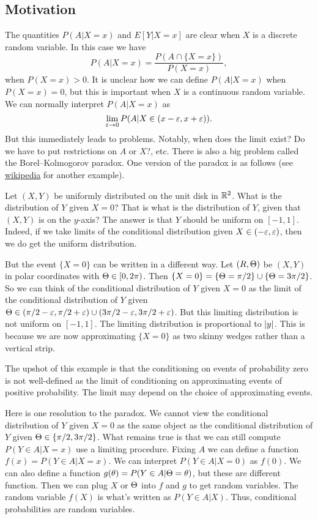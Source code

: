 \subsection{Motivation}
The quantities $P(A|X=x)$ and $E[Y|X=x]$ are clear when $X$ is a discrete random variable. In this case we have 
\[P(A |X=x) = \frac{P(A \cap \{X=x\})}{P(X=x)}, \]
when $P(X=x) > 0$. It is unclear how we can define $P(A|X=x)$ when $P(X=x)=0$, but this is important when $X$ is a continuous random variable. We can normally interpret $P(A|X=x)$ as
\[\lim_{\varepsilon \to 0} P(A |X\in (x-\varepsilon,x+\varepsilon)). \]
But this immediately leads to problems. Notably, when does the limit exist? Do we have to put restrictions on $A$ or $X$?, etc.  There is also a big problem called the Borel--Kolmogorov paradox. One version of the paradox is as follows (see \href{https://en.wikipedia.org/wiki/Borel%E2%80%93Kolmogorov_paradox}{wikipedia} for another example). 
\begin{example}
    Let $(X,Y)$ be uniformly distributed on the unit disk in ${\mathbb R}^2$. What is the distribution of $Y$ given $X=0$? That is what is the distribution of $Y$, given that $(X,Y)$ is on the $y$-axis? The answer is that $Y$ should be uniform on $[-1,1]$. Indeed, if we take limits of the conditional distribution given $X\in (-\varepsilon,\varepsilon)$, then we do get the uniform distribution. 

    But the event $\{X=0\}$ can be written in a different way. Let $(R,{\Theta})$ be $(X,Y)$ in polar coordinates with ${\Theta} \in [0,2\pi)$.  Then $\{X=0\}=\{{\Theta} = \pi/2\} \cup \{{\Theta} = 3\pi/2\}$. So we can think of the conditional distribution of $Y$ given $X=0$ as the limit of the conditional distribution of $Y$ given ${\Theta} \in (\pi/2-\varepsilon,\pi/2+\varepsilon) \cup(3\pi/2 - \varepsilon, 3\pi/2+\varepsilon)$. But this limiting distribution is not uniform on $[-1,1]$. The limiting distribution is proportional to ${\left\lvert y\right\rvert}$. This is because we are now approximating $\{X=0\}$ as two skinny wedges rather than a vertical strip.
\end{example} 
The upshot of this example is that the conditioning on events of probability zero is not well-defined as the limit of conditioning on approximating events of positive probability. The limit may depend on the choice of approximating events. 

Here is one resolution to the paradox. We cannot view the conditional distribution of $Y$ given $X=0$ as the same object as the conditional distribution of $Y$ given ${\Theta} \in \{\pi/2, 3\pi/2\}$. What remains true is that we can still compute $P(Y \in A |X=x)$ use a limiting procedure. Fixing $A$ we can define a function $f(x) = P(Y \in A |X=x)$. We can interpret $P(Y \in A|X=0)$ as $f(0)$. We can also define a function $g({\theta}) = P(Y \in A|{\Theta}={\theta})$, but these are different function. Then we can plug $X$ or ${\Theta}$ into $f$ and $g$ to get random variables. The random variable $f(X)$ is what's written as $P(Y \in A|X)$. Thus, conditional probabilities are random variables.

